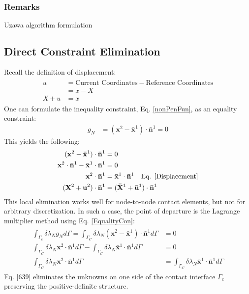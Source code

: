 \documentclass[12pt,3p]{article}
\numberwithin{equation}{section}
\begin{document}
\subsubsection{Remarks}
Uzawa algorithm formulation

 
\subsection{Direct Constraint Elimination}
Recall the definition of displacement: 
\begin{align}\label{Displacement}
\begin{split}
u &= \text{Current Coordinates} - \text{Reference Coordinates} \\
   &= x - X \\
X + u &= x  
\end{split}
\end{align}
One can formulate the inequality constraint, Eq. \ref{nonPenFun}, as an equality constraint:
\begin{align}\label{EqualityCon}
g_{N} &= (\mathbf{x}^2 - \mathbf{\bar{x}}^1) \cdot \mathbf{\bar{n}}^1 = 0 
\end{align}
This yields the following: 
\begin{align}\label{638}
\begin{split}
(\mathbf{x}^2 - \mathbf{\bar{x}}^1) \cdot \mathbf{\bar{n}}^1 &= 0 \\ 
\mathbf{x}^2 \cdot \mathbf{\bar{n}}^1 - \mathbf{\bar{x}}^1 \cdot \mathbf{\bar{n}}^1 &= 0 \\
\mathbf{x}^2 \cdot \mathbf{\bar{n}}^1 &= \mathbf{\bar{x}}^1 \cdot \mathbf{\bar{n}}^1 \quad \text{Eq. \ref{Displacement}} \\
(\mathbf{X}^2 + \mathbf{u}^2) \cdot \mathbf{\bar{n}}^1 &= (\mathbf{\bar{X}}^1 + \mathbf{\bar{u}}^1) \cdot \mathbf{\bar{n}}^1
\end{split}
\end{align}
This local elimination works well for node-to-node contact elements, but not for arbitrary discretization. In such a case, the point of departure is the Lagrange multiplier method using Eq. \ref{EqualityCon}:
\begin{align}\label{639}
\begin{split}
\int_{\Gamma_c} \delta \lambda_N g_N d \Gamma = \int_{\Gamma_C} \delta \lambda_N (\mathbf{x}^2 - \mathbf{\bar{x}}^1) \cdot \mathbf{\bar{n}}^1 d \Gamma &= 0 \\
\int_{\Gamma_C} \delta \lambda_N \mathbf{x}^2 \cdot \mathbf{\bar{n}}^1 d \Gamma - \int_{\Gamma_C} \delta \lambda_N \mathbf{\bar{x}}^1 \cdot \mathbf{\bar{n}}^1 d \Gamma &= 0 \\
\int_{\Gamma_C} \delta \lambda_N \mathbf{x}^2 \cdot \mathbf{\bar{n}}^1 d \Gamma &= \int_{\Gamma_C} \delta \lambda_N \mathbf{\bar{x}}^1 \cdot \mathbf{\bar{n}}^1 d \Gamma
\end{split}
\end{align}
Eq. \ref{639} eliminates the unknowns on one side of the contact interface $\Gamma_c$ preserving the positive-definite structure.
\end{document}
